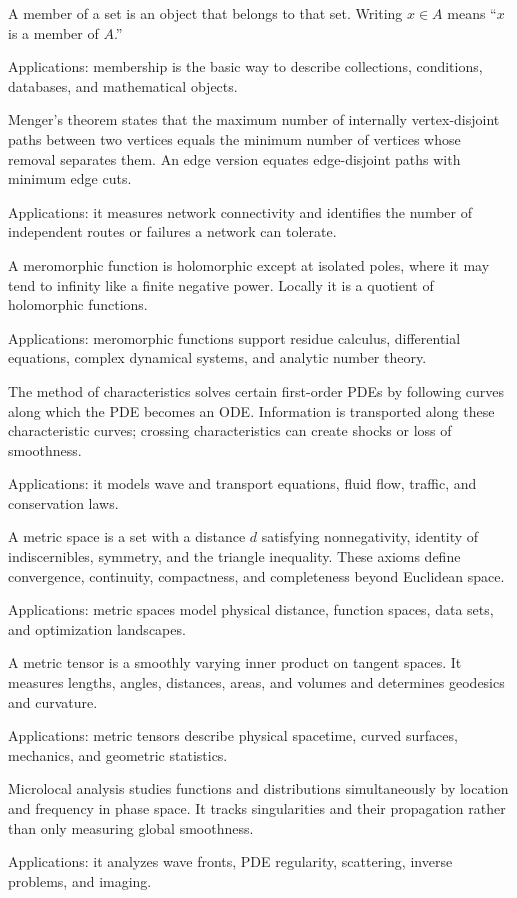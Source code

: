 A member of a set is an object that belongs to that set. Writing $x\in A$ means “$x$ is a member of $A$.” \par\noindent Applications: membership is the basic way to describe collections, conditions, databases, and mathematical objects.

Menger's theorem states that the maximum number of internally vertex-disjoint paths between two vertices equals the minimum number of vertices whose removal separates them. An edge version equates edge-disjoint paths with minimum edge cuts. \par\noindent Applications: it measures network connectivity and identifies the number of independent routes or failures a network can tolerate.

A meromorphic function is holomorphic except at isolated poles, where it may tend to infinity like a finite negative power. Locally it is a quotient of holomorphic functions. \par\noindent Applications: meromorphic functions support residue calculus, differential equations, complex dynamical systems, and analytic number theory.

The method of characteristics solves certain first-order PDEs by following curves along which the PDE becomes an ODE. Information is transported along these characteristic curves; crossing characteristics can create shocks or loss of smoothness. \par\noindent Applications: it models wave and transport equations, fluid flow, traffic, and conservation laws.

A metric space is a set with a distance $d$ satisfying nonnegativity, identity of indiscernibles, symmetry, and the triangle inequality. These axioms define convergence, continuity, compactness, and completeness beyond Euclidean space. \par\noindent Applications: metric spaces model physical distance, function spaces, data sets, and optimization landscapes.

A metric tensor is a smoothly varying inner product on tangent spaces. It measures lengths, angles, distances, areas, and volumes and determines geodesics and curvature. \par\noindent Applications: metric tensors describe physical spacetime, curved surfaces, mechanics, and geometric statistics.

Microlocal analysis studies functions and distributions simultaneously by location and frequency in phase space. It tracks singularities and their propagation rather than only measuring global smoothness. \par\noindent Applications: it analyzes wave fronts, PDE regularity, scattering, inverse problems, and imaging.

